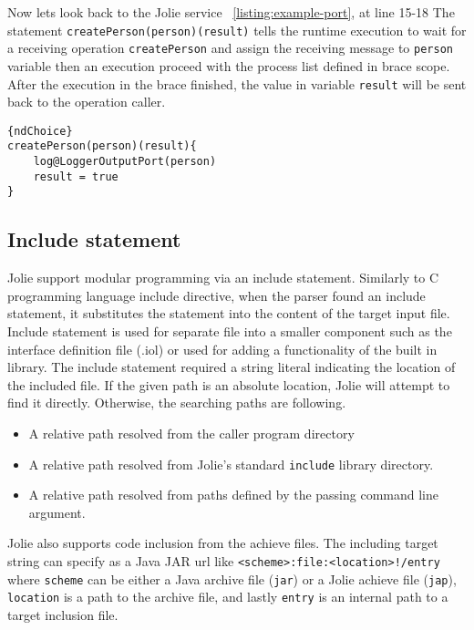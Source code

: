 Now lets look back to the Jolie service ~\ref{listing:example-port}, at line 15-18
The statement \texttt{createPerson(person)(result)} tells the runtime execution to wait for a receiving operation \texttt{createPerson} and assign the receiving message to \texttt{person} variable then an execution proceed with the process list defined in brace scope. After the execution in the brace finished, the value in variable \texttt{result} will be sent back to the operation caller.

\begin{listing}[h]
    \lstset{language=Jolie,
        style=codeStyle,
        numbers=left,
        firstnumber=1
    }
    \begin{lstlisting}[frame=tlrb]{ndChoice}
createPerson(person)(result){
    log@LoggerOutputPort(person)
    result = true
}
\end{lstlisting}
\end{listing}

\FloatBarrier


\subsection{Include statement}
\label{sec:jolie-include}

Jolie support modular programming via an include statement. Similarly to C programming language include directive, when the parser found an include statement, it substitutes the statement into the content of the target input file. Include statement is used for separate file into a smaller component such as the interface definition file (.iol) or used for adding a functionality of the built in library. The include statement required a string literal indicating the location of the included file. If the given path is an absolute location, Jolie will attempt to find it directly. Otherwise, the searching paths are following.

\begin{itemize}
    \item A relative path resolved from the caller program directory
    \item A relative path resolved from Jolie's standard \texttt{include} library directory.
    \item A relative path resolved from paths defined by the passing command line argument.
\end{itemize}

Jolie also supports code inclusion from the achieve files.
The including target string can specify as a Java JAR url like \texttt{<scheme>:file:<location>\newline!/{entry}} where \texttt{scheme} can be either a Java archive file (\texttt{jar}) or a Jolie achieve file (\texttt{jap}), \texttt{location} is a path to the archive file, and lastly \texttt{entry} is an internal path to a target inclusion file.

